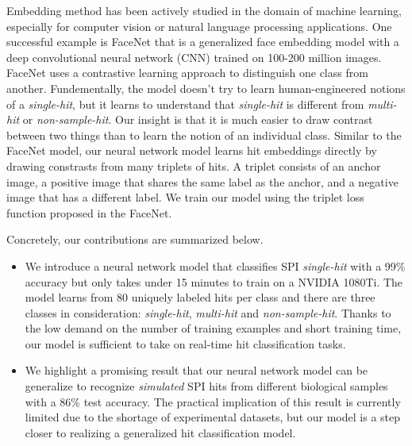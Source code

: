 Embedding method has been actively studied in the domain of machine learning,
especially for computer vision or natural language processing applications.  One
successful example is FaceNet \cite{schroffFaceNetUnifiedEmbedding2015} that is
a generalized face embedding model with a deep convolutional neural network (CNN)
trained on 100-200 million images.  FaceNet uses a contrastive learning approach
to distinguish one class from another.  Fundementally, the model doesn't try to
learn human-engineered notions of a \textit{single-hit}, but it learns to
understand that \textit{single-hit} is different from \textit{multi-hit} or
\textit{non-sample-hit}.  Our insight is that it is much easier to draw contrast
between two things than to learn the notion of an individual class.  Similar to
the FaceNet model, our neural network model learns hit embeddings directly by
drawing constrasts from many triplets of hits.  A triplet consists of an anchor
image, a positive image that shares the same label as the anchor, and a negative
image that has a different label.  We train our model using the triplet loss
function proposed in the FaceNet.  

Concretely, our contributions are summarized below.  

\begin{itemize}

    \item We introduce a neural network model that classifies SPI
    \textit{single-hit} with a 99\% accuracy but only takes under 15 minutes to
    train on a NVIDIA 1080Ti.  The model learns from 80 uniquely labeled hits
    per class and there are three classes in consideration: \textit{single-hit},
    \textit{multi-hit} and \textit{non-sample-hit}.  Thanks to the low demand on
    the number of training examples and short training time, our model is
    sufficient to take on real-time hit classification tasks.  

    \item We highlight a promising result that our neural network model can be
    generalize to recognize \textit{simulated} SPI hits from different
    biological samples with a 86\% test accuracy.  The practical implication of
    this result is currently limited due to the shortage of experimental
    datasets, but our model is a step closer to realizing a generalized hit
    classification model.

\end{itemize}
